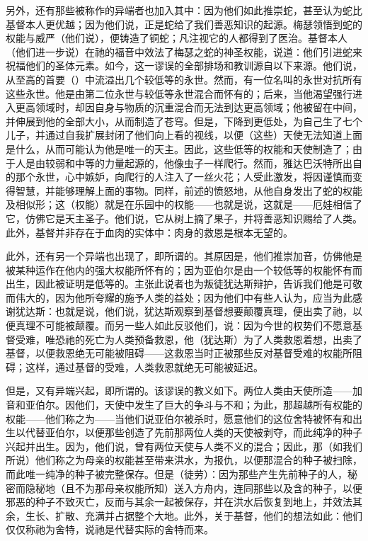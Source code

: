 另外，还有那些被称作的异端者也加入其中：因为他们如此推崇蛇，甚至认为蛇比基督本人更优越；因为他们说，正是蛇给了我们善恶知识的起源。梅瑟领悟到蛇的权能与威严（他们说），便铸造了铜蛇；凡注视它的人都得到了医治。基督本人（他们进一步说）在祂的福音中效法了梅瑟之蛇的神圣权能，说道：他们引进蛇来祝福他们的圣体元素。如今，这一谬误的全部排场和教训源自以下来源。他们说，从至高的首要（）中流溢出几个较低等的永世。然而，有一位名叫的永世对抗所有这些永世。他是由第二位永世与较低等永世混合而怀有的；后来，当他渴望强行进入更高领域时，却因自身与物质的沉重混合而无法到达更高领域；他被留在中间，并伸展到他的全部大小，从而制造了苍穹。但是，下降到更低处，为自己生了七个儿子，并通过自我扩展封闭了他们向上看的视线，以便（这些）天使无法知道上面是什么，从而可能认为他是唯一的天主。因此，这些低等的权能和天使制造了；由于人是由较弱和中等的力量起源的，他像虫子一样爬行。然而，雅达巴沃特所出自的那个永世，心中嫉妒，向爬行的人注入了一丝火花；人受此激发，将因谨慎而变得智慧，并能够理解上面的事物。同样，前述的愤怒地，从他自身发出了蛇的权能及相似形；这（权能）就是在乐园中的权能——也就是说，这就是——厄娃相信了它，仿佛它是天主圣子。他们说，它从树上摘了果子，并将善恶知识赐给了人类。此外，基督并非存在于血肉的实体中：肉身的救恩是根本无望的。\par

此外，还有另一个异端也出现了，即所谓的。其原因是，他们推崇加音，仿佛他是被某种运作在他内的强大权能所怀有的；因为亚伯尔是由一个较低等的权能怀有而出生，因此被证明是低等的。主张此说者也为叛徒犹达斯辩护，告诉我们他是可敬而伟大的，因为他所夸耀的施予人类的益处；因为他们中有些人认为，应当为此感谢犹达斯：也就是说，他们说，犹达斯观察到基督想要颠覆真理，便出卖了祂，以便真理不可能被颠覆。而另一些人如此反驳他们，说：因为今世的权势们不愿意基督受难，唯恐祂的死亡为人类预备救恩，他（犹达斯）为了人类救恩着想，出卖了基督，以便救恩绝无可能被阻碍——这救恩当时正被那些反对基督受难的权能所阻碍；这样，通过基督的受难，人类救恩就绝无可能被延迟。\par

但是，又有异端兴起，即所谓的。该谬误的教义如下。两位人类由天使所造——加音和亚伯尔。因他们，天使中发生了巨大的争斗与不和；为此，那超越所有权能的权能——他们称之为——当他们说亚伯尔被杀时，愿意他们的这位舍特被怀有和出生以代替亚伯尔，以便那些创造了先前那两位人类的天使被剥夺，而此纯净的种子兴起并出生。因为，他们说，曾有两位天使与人类不义的混合；因此，那（如我们所说）他们称之为母亲的权能甚至带来洪水，为报仇，以便那混合的种子被扫除，而此唯一纯净的种子被完整保存。但是（徒劳）：因为那些产生先前种子的人，秘密而隐秘地（且不为那母亲权能所知）送入方舟内，连同那些以及含的种子，以便邪恶的种子不致灭亡，反而与其余一起被保存，并在洪水后恢复到地上，并效法其余，生长、扩散、充满并占据整个大地。此外，关于基督，他们的想法如此：他们仅仅称祂为舍特，说祂是代替实际的舍特而来。\par


